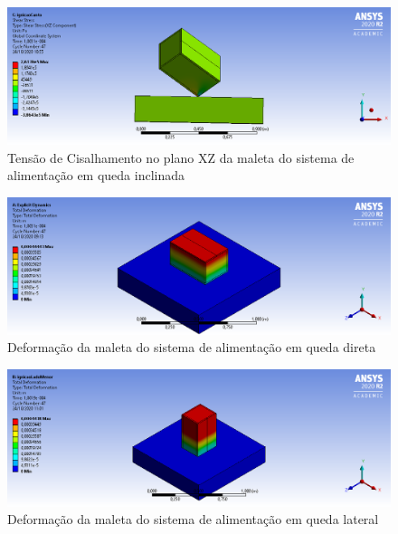 \begin{apendicesenv}
\begin{figure}[htb]
    \centering
    \includegraphics[width=1.0\textwidth, angle=0]{figuras/estrutura_simulacaoImpacto/ignicaoCisalhamentoXZCanto.png}
    \caption{Tensão de Cisalhamento no plano XZ da maleta do sistema de alimentação em queda inclinada}
    \label{fig:simulacaoImpacto_06}
\end{figure}

\begin{figure}[htb]
    \centering
    \includegraphics[width=1.0\textwidth, angle=0]{figuras/estrutura_simulacaoImpacto/ignicaoDeformacaoLadoMaior.png}
    \caption{Deformação da maleta do sistema de alimentação em queda direta}
    \label{fig:simulacaoImpacto_07}
\end{figure}

\begin{figure}[htb]
    \centering
    \includegraphics[width=1.0\textwidth, angle=0]{figuras/estrutura_simulacaoImpacto/ignicaoDeformacaoLadoMenor.png}
    \caption{Deformação da maleta do sistema de alimentação em queda lateral}
    \label{fig:simulacaoImpacto_08}
\end{figure}


\end{apendicesenv}
